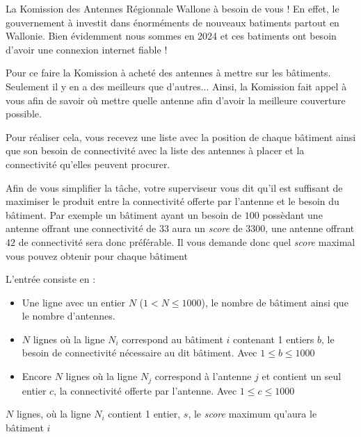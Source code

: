 \problemname{\problemyamlname}


La Komission des Antennes Régionnale Wallone à besoin de vous ! En effet, le gouvernement à investit dans énorméments de nouveaux batiments partout en Wallonie. Bien évidemment nous sommes en 2024 et ces batiments ont besoin d'avoir une connexion internet fiable !

Pour ce faire la Komission à acheté des antennes à mettre sur les bâtiments. Seulement il y en a des meilleurs que d'autres... Ainsi, la Komission fait appel à vous afin de savoir où mettre quelle antenne afin d'avoir la meilleure couverture possible.

Pour réaliser cela, vous recevez une liste avec la position de chaque bâtiment ainsi que son besoin de connectivité avec la liste des antennes à placer et la connectivité qu'elles peuvent procurer.

Afin de vous simplifier la tâche, votre superviseur vous dit qu'il est suffisant de maximiser le produit entre la connectivité offerte par l'antenne et le besoin du bâtiment. Par exemple un bâtiment ayant un besoin de \(100\) possèdant une antenne offrant une connectivité de \(33\) aura un \textit{score} de \(3300\), une antenne offrant \(42\) de connectivité sera donc préférable. Il vous demande donc quel \textit{score} maximal vous pouvez obtenir pour chaque bâtiment

\begin{Input}
    L'entrée consiste en :
    \begin{itemize}
        \item Une ligne avec un entier \(N\) (\(1 < N \leq 1000\)), le nombre de bâtiment ainsi que le nombre d'antennes.
      \item \(N\) lignes où la ligne \(N_{i}\) correspond au bâtiment \(i\) contenant 1 entiers \(b\), le besoin de connectivité nécessaire au dit bâtiment. Avec \(1 \leq b \leq 1000\)
      \item Encore \(N\) lignes où la ligne \(N_{j}\) correspond à l'antenne \(j\) et contient un seul entier \(c\), la connectivité offerte par l'antenne. Avec \(1 \leq c \leq 1000\)
    \end{itemize}
\end{Input}

\begin{Output}
  \(N\) lignes, où la ligne \(N_{i}\) contient 1 entier, \(s\), le \textit{score} maximum qu'aura le bâtiment \(i\)
\end{Output}
